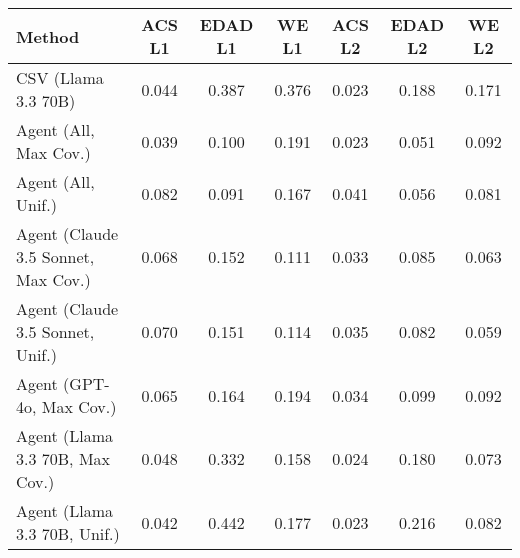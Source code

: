 \begin{tabular}{lcccccc}
\toprule
Method & ACS L1 & EDAD L1 & WE L1 & ACS L2 & EDAD L2 & WE L2 \\
\midrule
CSV (Llama 3.3 70B) & \cellcolor{bronze!30}0.044 & 0.387 & 0.376 & \cellcolor{gold!30}0.023 & 0.188 & 0.171 \\
Agent (All, Max Cov.) & \cellcolor{gold!30}0.039 & \cellcolor{silver!30}0.100 & 0.191 & \cellcolor{bronze!30}0.023 & \cellcolor{gold!30}0.051 & 0.092 \\
Agent (All, Unif.) & 0.082 & \cellcolor{gold!30}0.091 & 0.167 & 0.041 & \cellcolor{silver!30}0.056 & 0.081 \\
Agent (Claude 3.5 Sonnet, Max Cov.) & 0.068 & 0.152 & \cellcolor{gold!30}0.111 & 0.033 & 0.085 & \cellcolor{silver!30}0.063 \\
Agent (Claude 3.5 Sonnet, Unif.) & 0.070 & \cellcolor{bronze!30}0.151 & \cellcolor{silver!30}0.114 & 0.035 & \cellcolor{bronze!30}0.082 & \cellcolor{gold!30}0.059 \\
Agent (GPT-4o, Max Cov.) & 0.065 & 0.164 & 0.194 & 0.034 & 0.099 & 0.092 \\
Agent (Llama 3.3 70B, Max Cov.) & 0.048 & 0.332 & \cellcolor{bronze!30}0.158 & 0.024 & 0.180 & \cellcolor{bronze!30}0.073 \\
Agent (Llama 3.3 70B, Unif.) & \cellcolor{silver!30}0.042 & 0.442 & 0.177 & \cellcolor{silver!30}0.023 & 0.216 & 0.082 \\
\bottomrule
\end{tabular}